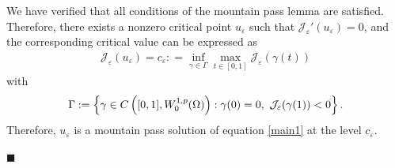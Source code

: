 \documentclass[onecolumn]{autart}
\newenvironment{proof}{{\it Proof: \enspace}}{\hfill $\blacksquare$\par}
\begin{document}
\begin{proof}
	We have verified that all conditions of the mountain pass lemma are satisfied. Therefore, there exists a nonzero critical point $u_\varepsilon$ such that $\mathcal{J}_\varepsilon'(u_\varepsilon) = 0$, and the corresponding critical value can be expressed as
	\begin{align}\label{1.20}
		\mathcal{J}_\varepsilon(u_\varepsilon)=c_\varepsilon: = \inf_{\gamma \in \Gamma} \max_{t \in [0,1]} \mathcal{J}_\varepsilon(\gamma(t))
	\end{align}
	with
	\begin{align}
		\Gamma := \left\{ \gamma \in C\left([0,1], W_0^{1,p}(\Omega)\right) : \gamma(0) = 0,\ \mathcal{J}_\varepsilon(\gamma(1)) < 0 \right\}.\notag
	\end{align}
	Therefore, $u_\varepsilon$ is a mountain pass solution of equation \eqref{main1} at the level $c_\varepsilon$.
	

\end{proof}
\end{document}
